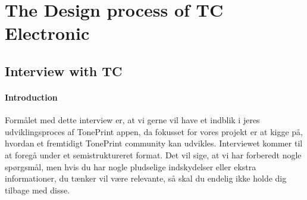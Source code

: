 \chapter{The Design process of TC Electronic}
\label{Interview}



\section{Interview with TC}
\label{InterviewInputs}

\subsubsection{Introduction}
Formålet med dette interview er, at vi gerne vil have et indblik i jeres udviklingsproces af TonePrint appen, da fokusset for vores projekt er at kigge på, hvordan et fremtidigt TonePrint community kan udvikles. Interviewet kommer til at foregå under et semistruktureret format. Det vil sige, at vi har forberedt nogle spørgsmål, men hvis du har nogle pludselige indskydelser eller ekstra informationer, du tænker vil være relevante, så skal du endelig ikke holde dig tilbage med disse.

